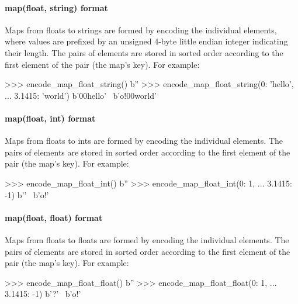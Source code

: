 \paragraph{map(float, string) format}

Maps from floats to strings are formed by encoding the individual elements,
where values are prefixed by an unsigned 4-byte little endian integer indicating
their length.  The pairs of elements are stored in sorted order according to the
first element of the pair (the map's key).  For example:

\begin{pythoncode}
>>> encode_map_float_string({})
b''
>>> encode_map_float_string({0: 'hello',
...                          3.1415: 'world'})
b'\x00hello' \
b'o\xca!\t@{}\x00world'
\end{pythoncode}

\paragraph{map(float, int) format}

Maps from floats to ints are formed by encoding the individual elements.  The
pairs of elements are stored in sorted order according to the first element of
the pair (the map's key).  For example:

\begin{pythoncode}
>>> encode_map_float_int({})
b''
>>> encode_map_float_int({0: 1,
...                       3.1415: -1})
b'\x00\x00\x00\x00\x00\x00\x00' \
b'o\xca!\t@\xff\xff\xff\xff\xff\xff\xff\xff'
\end{pythoncode}

\paragraph{map(float, float) format}

Maps from floats to floats are formed by encoding the individual elements.  The
pairs of elements are stored in sorted order according to the first element of
the pair (the map's key).  For example:

\begin{pythoncode}
>>> encode_map_float_float({})
b''
>>> encode_map_float_float({0: 1,
...                         3.1415: -1})
b'\x00\x00\x00\x00\x00\x00\x00?' \
b'o\xca!\t@{}\xbf'
\end{pythoncode}


